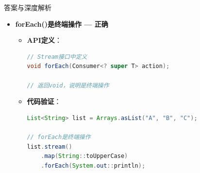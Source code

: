 \documentclass[12pt, a4paper]{ctexart}
\begin{document}
\begin{enumerate}[label=\textbf{\arabic*.}]
\begin{bluebox}{答案与深度解析}
\begin{itemize}[leftmargin=*, nosep, label={}]
\begin{itemize}[label={}, leftmargin=*, nosep]
\begin{lstlisting}[language=Java]
// 终端操作：触发执行
stream.collect(Collectors.toList());
// 此时才会输出过滤过程
				      \end{lstlisting}
				            \item \textbf{惰性求值机制}：
				                  \begin{itemize}[label={}, nosep]
					                  \item 中间操作构建操作链
					                  \item 终端操作触发整个链的执行
					                  \item 只在需要时才执行（优化性能）
				                  \end{itemize}
				            \item \textbf{代码验证}：
				                  \begin{lstlisting}[language=Java]
List<String> list = Arrays.asList("A", "BB", "CCC", "DDDD");

// 创建流（惰性）
Stream<String> stream = list.stream()
    .filter(s -> s.length() > 2)
    .map(String::toUpperCase);

// 触发执行
List<String> result = stream.collect(Collectors.toList());
System.out.println(result); // [CCC, DDDD]
				      \end{lstlisting}
			            \end{itemize}

			      \item[B] \textbf{forEach()是终端操作 — 正确}
			            \begin{itemize}[label={}, leftmargin=*, nosep]
				            \item \textbf{API定义}：
				                  \begin{lstlisting}[language=Java]
// Stream接口中定义
void forEach(Consumer<? super T> action);

// 返回void，说明是终端操作
				      \end{lstlisting}
				            \item \textbf{代码验证}：
				                  \begin{lstlisting}[language=Java]
List<String> list = Arrays.asList("A", "B", "C");

// forEach是终端操作
list.stream()
    .map(String::toUpperCase)
    .forEach(System.out::println);


\end{lstlisting}
\end{itemize}
\end{itemize}
\end{bluebox}
\end{enumerate}
\end{document}

